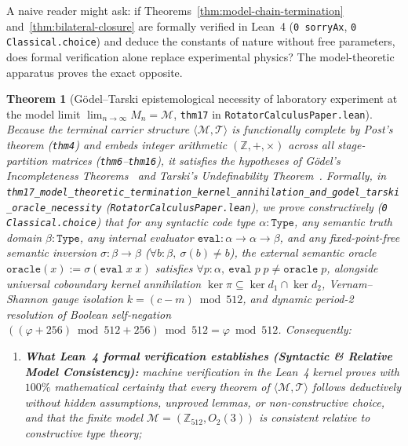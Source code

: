 \documentclass[11pt,a4paper]{article}
\newtheorem{theorem}{Theorem}[section]
\theoremstyle{definition}
\theoremstyle{remark}
\begin{document}
A naive reader might ask: if Theorems~\ref{thm:model-chain-termination} and~\ref{thm:bilateral-closure} are formally verified in Lean~4 (\texttt{0 sorryAx}, \texttt{0 Classical.choice}) and deduce the constants of nature without free parameters, does formal verification alone replace experimental physics? The model-theoretic apparatus proves the exact opposite.

\begin{theorem}[G\"odel--Tarski epistemological necessity of laboratory experiment at the model limit $\lim_{n\to\infty} M_n = \mathcal{M}$, \texttt{thm17} in \texttt{RotatorCalculusPaper.lean}]
\label{thm:godel-tarski-experiment}
Because the terminal carrier structure $\langle\mathcal{M},\mathcal{T}\rangle$ is functionally complete by Post's theorem (\texttt{thm4}) and embeds integer arithmetic $(\mathbb{Z},+,\times)$ across all stage-partition matrices (\texttt{thm6}--\texttt{thm16}), it satisfies the hypotheses of G\"odel's Incompleteness Theorems~\cite{Godel1931} and Tarski's Undefinability Theorem~\cite{Tarski1936}. Formally, in \texttt{thm17\_model\_theoretic\_termination\_kernel\_annihilation\_and\_godel\_tarski\_oracle\_necessity} (\texttt{RotatorCalculusPaper.lean}), we prove constructively (\texttt{0 Classical.choice}) that for any syntactic code type $\alpha : \texttt{Type}$, any semantic truth domain $\beta : \texttt{Type}$, any internal evaluator $\texttt{eval} : \alpha \to \alpha \to \beta$, and any fixed-point-free semantic inversion $\sigma : \beta \to \beta$ ($\forall b : \beta,\ \sigma(b)\ne b$), the external semantic oracle $\texttt{oracle}(x) := \sigma(\texttt{eval}\;x\;x)$ satisfies $\forall p : \alpha,\ \texttt{eval}\;p\;p \ne \texttt{oracle}\;p$, alongside universal coboundary kernel annihilation $\ker\pi \subseteq \ker d_1 \cap \ker d_2$, Vernam--Shannon gauge isolation $k = (c-m)\bmod 512$, and dynamic period-2 resolution of Boolean self-negation $((\varphi+256)\bmod 512 + 256)\bmod 512 = \varphi\bmod 512$. Consequently:
\begin{enumerate}[label=\textbf{(\roman*)},leftmargin=*]
\item \textbf{What Lean~4 formal verification establishes (Syntactic \& Relative Model Consistency):}
  machine verification in the Lean~4 kernel proves with $100\%$ mathematical certainty that every theorem of $\langle\mathcal{M},\mathcal{T}\rangle$ follows deductively without hidden assumptions, unproved lemmas, or non-constructive choice, and that the finite model $\mathcal{M} = (\mathbb{Z}_{512}, O_2(3))$ is consistent relative to constructive type theory;

\end{enumerate}
\end{theorem}
\end{document}
